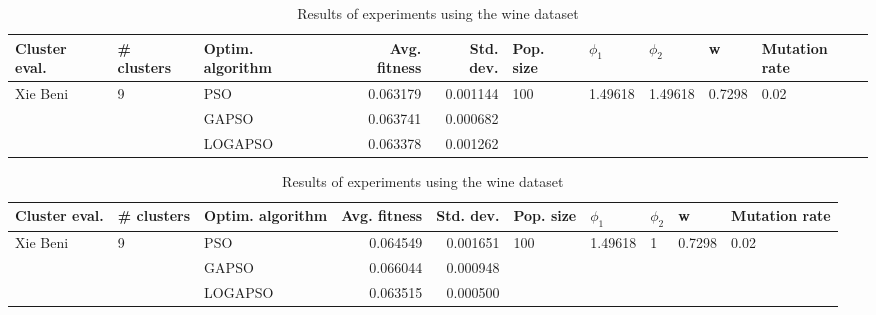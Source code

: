 \documentclass{article}
\begin{document}
\begin{table}
\centering
\caption{Results of experiments using the wine dataset}
\begin{tabular}{lllrrlllll}
\toprule
            Cluster eval. &        \# clusters & Optim. algorithm &  Avg. fitness &  Std. dev. &            Pop. size &               $\phi_{1}$ &               $\phi_{2}$ &                       w &         Mutation rate \\
\midrule
\multirow{3}{*}{Xie Beni} & \multirow{3}{*}{9} &              PSO &      0.063179 &   0.001144 & \multirow{3}{*}{100} & \multirow{3}{*}{1.49618} & \multirow{3}{*}{1.49618} & \multirow{3}{*}{0.7298} & \multirow{3}{*}{0.02} \\
                          &                    &            GAPSO &      0.063741 &   0.000682 &                      &                          &                          &                         &                       \\
                          &                    &          LOGAPSO &      0.063378 &   0.001262 &                      &                          &                          &                         &                       \\
\bottomrule
\end{tabular}
\end{table}
\begin{table}
\centering
\caption{Results of experiments using the wine dataset}
\begin{tabular}{lllrrlllll}
\toprule
            Cluster eval. &        \# clusters & Optim. algorithm &  Avg. fitness &  Std. dev. &            Pop. size &               $\phi_{1}$ &         $\phi_{2}$ &                       w &         Mutation rate \\
\midrule
\multirow{3}{*}{Xie Beni} & \multirow{3}{*}{9} &              PSO &      0.064549 &   0.001651 & \multirow{3}{*}{100} & \multirow{3}{*}{1.49618} & \multirow{3}{*}{1} & \multirow{3}{*}{0.7298} & \multirow{3}{*}{0.02} \\
                          &                    &            GAPSO &      0.066044 &   0.000948 &                      &                          &                    &                         &                       \\
                          &                    &          LOGAPSO &      0.063515 &   0.000500 &                      &                          &                    &                         &                       \\
\bottomrule
\end{tabular}
\end{table}
\end{document}
